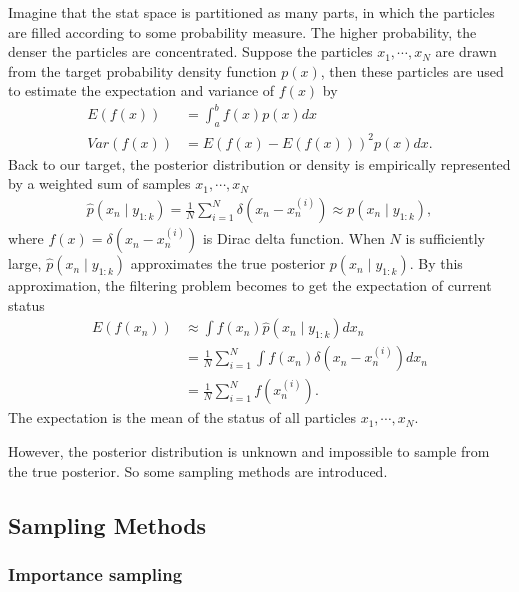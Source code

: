 Imagine that the stat space is partitioned as many parts, in which the particles are filled according to some probability measure. The higher probability, the denser the particles are concentrated. Suppose the particles $x_1, \cdots, x_N$ are drawn from the target probability density function $p(x)$, then these particles are used to estimate the expectation and variance of $f(x)$ by
\begin{align*}
E(f(x)) &= \int_a^bf(x)p(x)dx\\
Var(f(x)) &= E(f(x)-E(f(x)))^2p(x)dx.
\end{align*}
Back to our target, the posterior distribution or density is empirically represented by a weighted sum of samples $x_1, \cdots, x_N$ 
\begin{align*}
\hat{p}(x_n\mid y_{1:k})=\frac{1}{N}\sum_{i=1}^N\delta (x_n-x_n^{(i)})\approx p(x_n\mid y_{1:k}),
\end{align*}
where $f(x)=\delta (x_n-x_n^{(i)})$ is Dirac delta function. When $N$ is sufficiently large, $\hat{p}(x_n\mid y_{1:k})$ approximates the true posterior $p(x_n\mid y_{1:k})$. By this approximation, the filtering problem becomes to get the expectation of current status
\begin{align*}
E(f(x_n)) &\approx \int f(x_n)\hat{p}(x_n\mid y_{1:k})dx_n \\
 & =\frac{1}{N} \sum_{i=1}^N\int f(x_n) \delta (x_n-x_n^{(i)}) dx_n\\
 & = \frac{1}{N}\sum_{i=1}^Nf(x_n^{(i)}).
\end{align*}
The expectation is the mean of the status of all particles $x_1, \cdots, x_N$. 

However, the posterior distribution is unknown and impossible to sample from the true posterior. So some sampling methods are introduced.

\subsection{Sampling Methods}

\subsubsection{Importance sampling}

